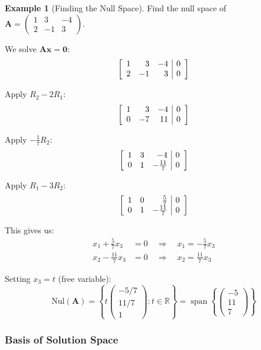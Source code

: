 \documentclass[12pt]{article}
\numberwithin{equation}{section}
\newcommand{\RR}{\mathbb{R}}
\newcommand{\vect}[1]{\boldsymbol{#1}}   %
\newcommand{\mat}[1]{\mathbf{#1}}        %
\newcommand{\Span}{\operatorname{span}}
\newenvironment{amatrix}[1]{%
  \left[\begin{array}{#1}}
  {\end{array}\right]}
\theoremstyle{plain}
\theoremstyle{definition}
\newtheorem{example}[theorem]{Example}
\theoremstyle{remark}
\begin{document}
\begin{example}[Finding the Null Space]
Find the null space of $\mat{A} = \begin{pmatrix} 1 & 3 & -4 \\ 2 & -1 & 3 \end{pmatrix}$.

We solve $\mat{A}\vect{x} = \vect{0}$:
$$\begin{amatrix}{rrr|r}
1 & 3 & -4 & 0\\
2 & -1 & 3 & 0
\end{amatrix}$$

Apply $R_2 - 2R_1$:
$$\begin{amatrix}{rrr|r}
1 & 3 & -4 & 0\\
0 & -7 & 11 & 0
\end{amatrix}$$

Apply $-\frac{1}{7}R_2$:
$$\begin{amatrix}{rrr|r}
1 & 3 & -4 & 0\\
0 & 1 & -\frac{11}{7} & 0
\end{amatrix}$$

Apply $R_1 - 3R_2$:
$$\begin{amatrix}{rrr|r}
1 & 0 & \frac{5}{7} & 0\\
0 & 1 & -\frac{11}{7} & 0
\end{amatrix}$$

This gives us:
\begin{align}
x_1 + \frac{5}{7}x_3 &= 0 \quad \Rightarrow \quad x_1 = -\frac{5}{7}x_3\\
x_2 - \frac{11}{7}x_3 &= 0 \quad \Rightarrow \quad x_2 = \frac{11}{7}x_3
\end{align}

Setting $x_3 = t$ (free variable):
$$\text{Nul}(\mat{A}) = \left\{t\begin{pmatrix} -5/7 \\ 11/7 \\ 1 \end{pmatrix} : t \in \RR\right\} = \Span\left\{\begin{pmatrix} -5 \\ 11 \\ 7 \end{pmatrix}\right\}$$
\end{example}

\subsubsection{Basis of Solution Space}
\end{document}

